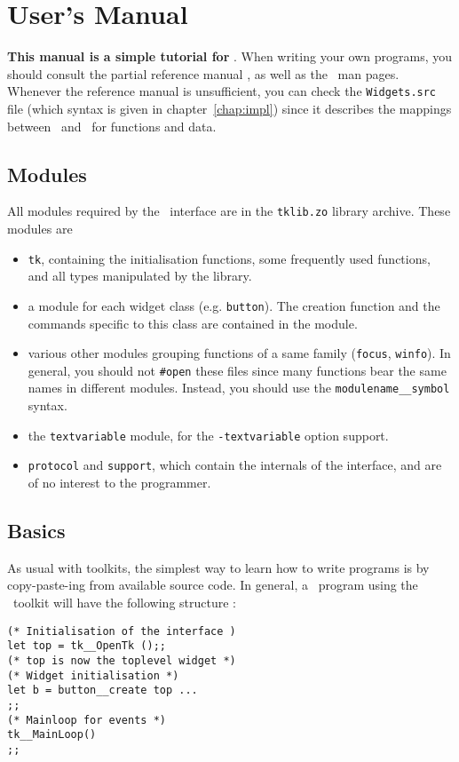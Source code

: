\chapter{User's Manual}
{\bf This manual is a simple tutorial for \caml\tk }.  When writing your own
programs, you should consult the partial reference manual , as well as the
\tk\ man pages.  Whenever the reference manual is unsufficient, you can
check the \verb|Widgets.src| file (which syntax is given in
chapter~\ref{chap:impl}) since it describes the mappings between
\tk\ and \caml\ for functions and data. 

\section{Modules}
All modules required by the \tk\ interface are in the \verb|tklib.zo| 
library archive. These modules are
\begin{itemize}
\item \verb|tk|, containing the initialisation functions, some frequently
used functions, and all types manipulated by the library.

\item a module for each widget class (e.g. \verb|button|). The creation
function and the commands specific to this class are contained in the
module.

\item various other modules grouping functions of a same family
(\verb|focus|, \verb|winfo|). In general, you should not \verb|#open| these
files since many functions bear the same names in different modules.
Instead, you should use the \verb|modulename__symbol| syntax.

\item the \verb|textvariable| module, for the \verb|-textvariable| option
support.

\item \verb|protocol| and \verb|support|, which contain the internals
of the interface, and are of no interest to the programmer.
\end{itemize} 

\section{Basics}
As usual with toolkits, the simplest way to learn how to write programs is
by copy-paste-ing from available source code. In general, a \caml\ program
using the \tk\ toolkit will have the following structure :
\begin{verbatim}
(* Initialisation of the interface )
let top = tk__OpenTk ();;
(* top is now the toplevel widget *)
(* Widget initialisation *)
let b = button__create top ...
;;
(* Mainloop for events *)
tk__MainLoop()
;;
\end{verbatim} 

